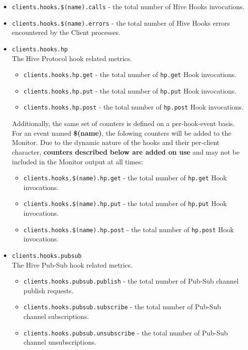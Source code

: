 \documentclass[a4paper]{article}
\begin{document}
\begin{itemize}
\item \texttt{clients.hooks.\$(name).calls} - the total number of Hive Hooks invocations.
\item \texttt{clients.hooks.\$(name).errors} - the total number of Hive Hooks errors encountered by the Client processes.
\end{itemize}
\begin{itemize}

\item \texttt{clients.hooks.hp}\\
\label{sec-4-2-9-1}%
The Hive Protocol hook related metrics.


\begin{itemize}
\item \texttt{clients.hooks.hp.get} - the total number of \texttt{hp.get} Hook invocations.
\item \texttt{clients.hooks.hp.put} - the total number of \texttt{hp.put} Hook invocations.
\item \texttt{clients.hooks.hp.post} - the total number of \texttt{hp.post} Hook invocations.
\end{itemize}

\noindent
Additionally, the same set of counters is defined on a per-hook-event basis. For an event named \textbf{\$(name)}, the folowing counters will be added to the Monitor. Due to the dynamic nature of the hooks and their per-client character, \textbf{counters described below are added on use} and may not be included in the Monitor output at all times:


\begin{itemize}
\item \texttt{clients.hooks.\$(name).hp.get} - the total number of \texttt{hp.get} Hook invocations.
\item \texttt{clients.hooks.\$(name).hp.put} - the total number of \texttt{hp.put} Hook invocations.
\item \texttt{clients.hooks.\$(name).hp.post} - the total number of \texttt{hp.post} Hook invocations.
\end{itemize}


\item \texttt{clients.hooks.pubsub}\\
\label{sec-4-2-9-2}%
The Hive Pub-Sub hook related metrics.


\begin{itemize}
\item \texttt{clients.hooks.pubsub.publish} - the total number of Pub-Sub channel publish requests.
\item \texttt{clients.hooks.pubsub.subscribe} - the total number of Pub-Sub channel subscriptions.
\item \texttt{clients.hooks.pubsub.unsubscribe} - the total number of Pub-Sub channel unsubscriptions.
\end{itemize}


\end{itemize}
\end{document}
